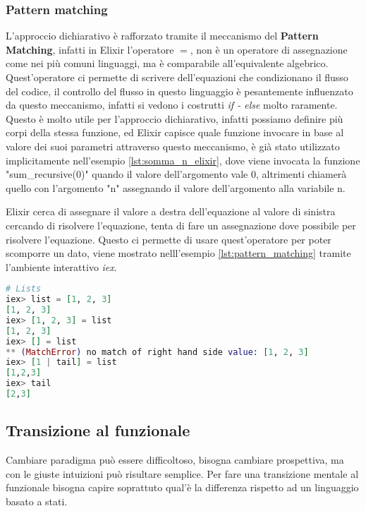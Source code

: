 \subsubsection{Pattern matching}

L'approccio dichiarativo è rafforzato tramite il meccanismo
del \textbf{Pattern Matching}, infatti in Elixir l'operatore $=$,
non è un operatore di assegnazione come nei più comuni linguaggi,
ma è comparabile all'equivalente algebrico.
Quest'operatore ci permette di scrivere dell'equazioni
che condizionano il flusso del codice, il controllo del flusso
in questo linguaggio è pesantemente influenzato da questo meccanismo,
infatti si vedono i costrutti \textit{if - else} molto raramente.
Questo è molto utile per l'approccio
dichiarativo, infatti possiamo definire più corpi della stessa funzione,
ed Elixir capisce quale funzione invocare in base
al valore dei suoi parametri attraverso questo meccanismo,
è già stato utilizzato implicitamente nell'esempio \ref{lst:somma_n_elixir},
dove viene invocata la funzione "sum\_recursive(0)" quando
il valore dell'argomento vale 0, altrimenti chiamerà quello
con l'argomento "n" assegnando il valore dell'argomento alla variabile n.

Elixir cerca di assegnare il valore a destra dell'equazione
al valore di sinistra cercando di risolvere l'equazione, tenta
di fare un assegnazione dove possibile per risolvere l'equazione.
Questo ci permette di usare quest'operatore per poter
scomporre un dato, viene mostrato nelll'esempio \ref{lst:pattern_matching}
tramite l'ambiente interattivo \textit{iex}.

\newpage

\begin{lstlisting}[language=elixir, caption={Pattern Matching},captionpos=b,
	label={lst:pattern_matching}]
# Lists
iex> list = [1, 2, 3]
[1, 2, 3]
iex> [1, 2, 3] = list
[1, 2, 3]
iex> [] = list
** (MatchError) no match of right hand side value: [1, 2, 3]
iex> [1 | tail] = list
[1,2,3]
iex> tail
[2,3]
\end{lstlisting}


\subsection{Transizione al funzionale}

Cambiare paradigma può essere difficoltoso, bisogna
cambiare prospettiva, ma con le giuste intuizioni
può risultare semplice. Per fare una transizione mentale al funzionale
bisogna capire soprattuto qual'è la differenza rispetto ad un
linguaggio basato a stati.

